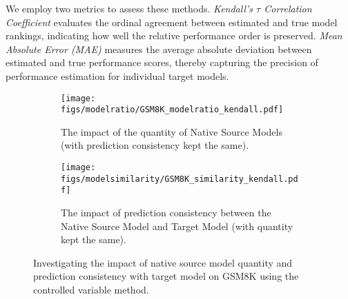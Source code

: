 We employ two metrics to assess these methods. \textit{Kendall's $\tau$ Correlation Coefficient} evaluates the ordinal agreement between estimated and true model rankings, indicating how well the relative performance order is preserved. \textit{Mean Absolute Error (MAE)} measures the average absolute deviation between estimated and true performance scores, thereby capturing the precision of performance estimation for individual target models.

\begin{figure*}[ht]
    \centering
    \begin{subfigure}[b]{0.49\textwidth} %
        \centering %
        \texttt{[image: figs/modelratio/GSM8K\_modelratio\_kendall.pdf]}
        \caption{The impact of the quantity of Native Source Models (with prediction consistency kept the same).}
        \label{fig:GSM8K_modelratio_kendall}
    \end{subfigure}
    \hfill %
    \begin{subfigure}[b]{0.49\textwidth} %
        \centering %
        \texttt{[image: figs/modelsimilarity/GSM8K\_similarity\_kendall.pdf]}
        \caption{The impact of prediction consistency between the Native Source Model and Target Model (with quantity kept the same).}
        \label{fig:GSM8K_similarity_kendall}
    \end{subfigure}
    \caption{Investigating the impact of native source model quantity and prediction consistency with target model on GSM8K using the controlled variable method.}
    \label{fig:GSM8K_combined}
    \vspace{-0.4cm}
\end{figure*}


